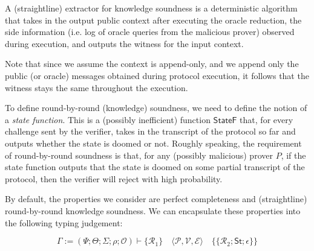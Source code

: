 A (straightline) extractor for knowledge soundness is a deterministic algorithm that takes in the output public context after executing the oracle reduction, the side information (i.e. log of oracle queries from the malicious prover) observed during execution, and outputs the witness for the input context.

Note that since we assume the context is append-only, and we append only the public (or oracle)
messages obtained during protocol execution, it follows that the witness stays the same throughout
the execution.

\begin{definition}
    \label{def:knowledge_soundness}
\end{definition}

To define round-by-round (knowledge) soundness, we need to define the notion of a \emph{state function}. This is a (possibly inefficient) function $\mathsf{StateF}$ that, for every challenge sent by the verifier, takes in the transcript of the protocol so far and outputs whether the state is doomed or not. Roughly speaking, the requirement of round-by-round soundness is that, for any (possibly malicious) prover $P$, if the state function outputs that the state is doomed on some partial transcript of the protocol, then the verifier will reject with high probability.

\begin{definition}
    \label{def:state_function}
\end{definition}

\begin{definition}
    \label{def:round_by_round_soundness}
\end{definition}

\begin{definition}
    \label{def:round_by_round_knowledge_soundness}
\end{definition}

By default, the properties we consider are perfect completeness and (straightline) round-by-round knowledge soundness. We can encapsulate these properties into the following typing judgement:

\[
    \Gamma := (\Psi; \Theta; \varSigma; \rho; \mathcal{O}) \vdash \{\mathcal{R}_1\} \quad \langle\mathcal{P}, \mathcal{V}, \mathcal{E}\rangle \quad \{\!\!\{\mathcal{R}_2; \mathsf{St}; \epsilon\}\!\!\}
\]

